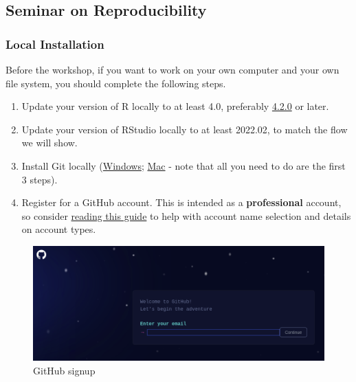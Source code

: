 \documentclass[
]{article}
\author{}
\date{\vspace{-2.5em}}
\providecommand{\tightlist}{%
  \setlength{\itemsep}{0pt}\setlength{\parskip}{0pt}}
\begin{document}
\hypertarget{seminar-on-reproducibility}{%
\subsection{Seminar on
Reproducibility}\label{seminar-on-reproducibility}}

\hypertarget{local-installation}{%
\subsubsection{Local Installation}\label{local-installation}}

Before the workshop, if you want to work on your own computer and your
own file system, you should complete the following steps.

\begin{enumerate}
\def\labelenumi{\arabic{enumi}.}
\tightlist
\item
  Update your version of R locally to at least 4.0, preferably
  \href{https://cran.r-project.org/}{4.2.0} or later.
\item
  Update your version of RStudio locally to at least 2022.02, to match
  the flow we will show.
\item
  Install Git locally
  (\href{https://git-for-windows.github.io/}{Windows};
  \href{https://ubc-mds.github.io/resources_pages/install_ds_stack_mac/\#git/}{Mac}
  - note that all you need to do are the first 3 steps).
\item
  Register for a GitHub account. This is intended as a
  \textbf{professional} account, so consider
  \href{https://happygitwithr.com/github-acct.html}{reading this guide}
  to help with account name selection and details on account types.
\end{enumerate}

\begin{figure}
\centering
\includegraphics{img/github_signup.png?raw=true}
\caption{GitHub signup}
\end{figure}
\end{document}
